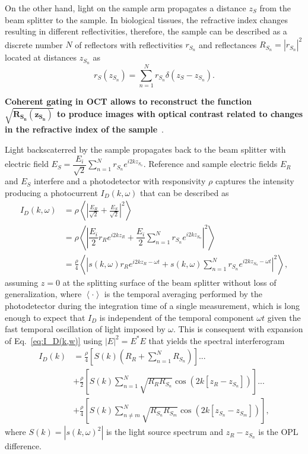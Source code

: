 On the other hand, light on the sample arm propagates a distance $z_S$ from the beam splitter to the sample. In biological tissues, the refractive index changes resulting in different reflectivities, therefore, the sample can be described as a discrete number $N$ of reflectors with reflectivities $r_{S_n}$ and reflectances $R_{S_n}=|r_{S_n}|^2$ located at distances $z_{S_n}$ as
\begin{equation}
    r_S(z_{S_n}) = \sum_{n=1}^N r_{S_n}\delta\left(z_S-z_{S_n}\right).
\end{equation}

\textbf{Coherent gating in OCT allows to reconstruct the function $\mathbf{\sqrt{R_{S_n}(z_{S_n})}}$ to produce images with optical contrast related to changes in the refractive index of the sample}~\cite{Izatt2015_Theory}.

Light backscaterred by the sample propagates back to the beam splitter with electric field $E_S=\dfrac{E_i}{\sqrt{2}}\sum\limits_{n=1}^Nr_{S_n}e^{i2kz_{S_n}}$. Reference and sample electric fields $E_R$ and $E_S$ interfere and a photodetector with responsivity $\rho$ captures the intensity producing a photocurrent $I_D(k, \omega)$ that can be described as~\cite{Izatt2015_Theory}
\begin{align}\label{eq:I_D(k,w)}
    I_D(k, \omega) &= \rho\left<\left|\frac{E_R}{\sqrt{2}} + \frac{E_S}{\sqrt{2}}\right|^2\right> \nonumber\\
    & = \rho\left<\left|\dfrac{E_i}{2} r_R e^{i2kz_R} + \dfrac{E_i}{2}\sum\limits_{n=1}^Nr_{S_n}e^{i2kz_{S_n}}\right|^2\right> \\
    & = \frac{\rho}{4}\left<\left|s(k,\omega) r_R e^{i2kz_R-\omega t} + s(k,\omega)\sum\limits_{n=1}^Nr_{S_n}e^{i2kz_{S_n}-\omega t}\right|^2\right>, \nonumber
\end{align}
assuming $z=0$ at the splitting surface of the beam splitter without loss of generalization, where $\left<\cdot\right>$ is the temporal averaging performed by the photodetector during the integration time of a single measurement, which is long enough to expect that $I_D$ is independent of the temporal component $\omega t$ given the fast temporal oscillation of light imposed by $\omega$. This is consequent with expansion of Eq.~\eqref{eq:I_D(k,w)} using $|E|^2 = E^*E$ that yields the spectral interferogram~\cite{Izatt2015_Theory}
\begin{align}\label{eq:I_D(k)}
I_D(k) &= \frac{\rho}{4}\left[S(k)\left(R_R + \sum_{n=1}^N R_{S_n}\right)\right] ... \nonumber\\
&+ \frac{\rho}{2} \left[S(k)\sum_{n=1}^N\sqrt{R_RR_{S_n}}\cos\left(2k\left[z_R-z_{S_n}\right]\right)\right] ... \\
&+ \frac{\rho}{4}\left[S(k)\sum_{n\neq m}^N\sqrt{R_{S_n}R_{S_m}}\cos\left(2k\left[z_{S_n}-z_{S_m}\right]\right)\right], \nonumber
\end{align}
where $S(k) = |s(k,\omega)^2|$ is the light source spectrum and $z_R-z_{S_n}$ is the OPL difference.

